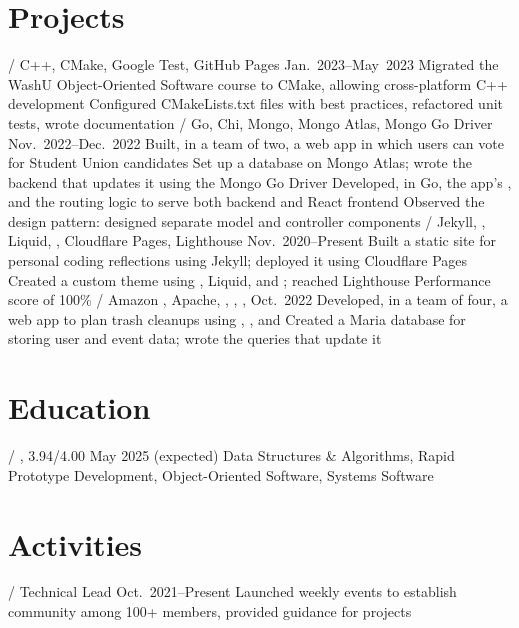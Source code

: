 \section{Projects}
\begin{outline}
     / C++, CMake, Google Test, GitHub Pages
    \hfill Jan.\ 2023--May\ 2023
        \1 Migrated the WashU Object-Oriented Software course to CMake, allowing cross-platform C++ development
            \2 Configured CMakeLists.txt files with best practices, refactored unit tests, wrote documentation
     / Go, Chi, Mongo, Mongo Atlas, Mongo Go Driver
    \hfill Nov.\ 2022--Dec.\ 2022
        \1 Built, in a team of two, a web app in which users can vote for Student Union candidates
            \2 Set up a database on Mongo Atlas; wrote the backend that updates it using the Mongo Go Driver
            \2 Developed, in Go, the app's  , and the routing logic to serve both backend and React frontend
            \2 Observed the  design pattern: designed separate model and controller components
     / Jekyll, , Liquid, , Cloudflare Pages, Lighthouse
    \hfill Nov.\ 2020--Present
        \1 Built a static site for personal coding reflections using Jekyll; deployed it using Cloudflare Pages
            \2 Created a custom theme using , Liquid, and ; reached Lighthouse Performance score of 100\%
     / Amazon , Apache, , , , 
    \hfill Oct.\ 2022
        \1 Developed, in a team of four, a web app to plan trash cleanups using , , and 
            \2 Created a Maria database for storing user and event data; wrote the  queries that update it
\end{outline}

\section{Education}
\begin{outline}
     / ,  3.94/4.00
    \hfill May 2025 (expected)
        \1 Data Structures \& Algorithms, Rapid Prototype Development, Object-Oriented Software, Systems Software
\end{outline}

\section{Activities}
\begin{outline}
     / Technical Lead
    \hfill Oct.\ 2021--Present
        \1 Launched weekly events to establish community among 100+ members, provided guidance for  projects
\end{outline}
